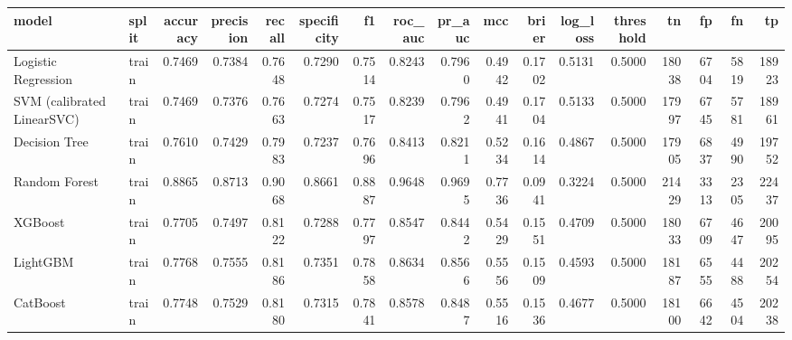\begin{tabular}{llrrrrrrrrrrrrrrr}
\toprule
model & split & accuracy & precision & recall & specificity & f1 & roc\_auc & pr\_auc & mcc & brier & log\_loss & threshold & tn & fp & fn & tp \\
\midrule
Logistic Regression & train & 0.7469 & 0.7384 & 0.7648 & 0.7290 & 0.7514 & 0.8243 & 0.7960 & 0.4942 & 0.1702 & 0.5131 & 0.5000 & 18038 & 6704 & 5819 & 18923 \\
SVM (calibrated LinearSVC) & train & 0.7469 & 0.7376 & 0.7663 & 0.7274 & 0.7517 & 0.8239 & 0.7962 & 0.4941 & 0.1704 & 0.5133 & 0.5000 & 17997 & 6745 & 5781 & 18961 \\
Decision Tree & train & 0.7610 & 0.7429 & 0.7983 & 0.7237 & 0.7696 & 0.8413 & 0.8211 & 0.5234 & 0.1614 & 0.4867 & 0.5000 & 17905 & 6837 & 4990 & 19752 \\
Random Forest & train & 0.8865 & 0.8713 & 0.9068 & 0.8661 & 0.8887 & 0.9648 & 0.9695 & 0.7736 & 0.0941 & 0.3224 & 0.5000 & 21429 & 3313 & 2305 & 22437 \\
XGBoost & train & 0.7705 & 0.7497 & 0.8122 & 0.7288 & 0.7797 & 0.8547 & 0.8442 & 0.5429 & 0.1551 & 0.4709 & 0.5000 & 18033 & 6709 & 4647 & 20095 \\
LightGBM & train & 0.7768 & 0.7555 & 0.8186 & 0.7351 & 0.7858 & 0.8634 & 0.8566 & 0.5556 & 0.1509 & 0.4593 & 0.5000 & 18187 & 6555 & 4488 & 20254 \\
CatBoost & train & 0.7748 & 0.7529 & 0.8180 & 0.7315 & 0.7841 & 0.8578 & 0.8487 & 0.5516 & 0.1536 & 0.4677 & 0.5000 & 18100 & 6642 & 4504 & 20238 \\
\bottomrule
\end{tabular}
